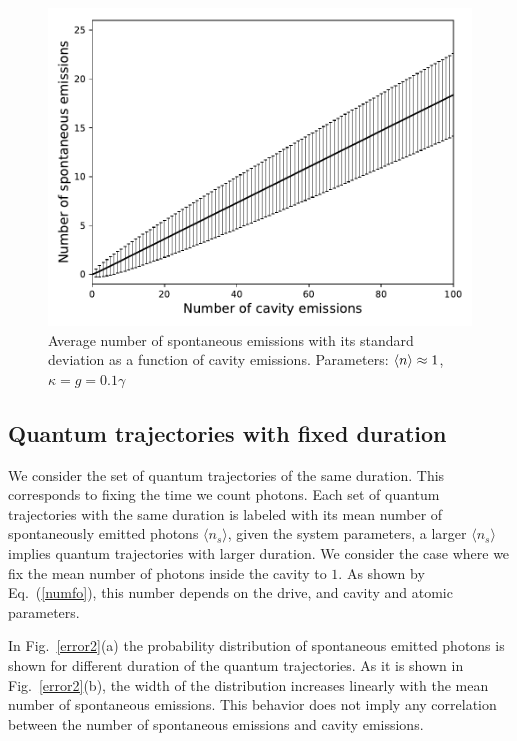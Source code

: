 \documentclass[%
 reprint,
 amsmath,amssymb,
 aps, 
]{revtex4-1}
\begin{document}
\begin{figure}[!h]  
\centering
\includegraphics[scale = 0.5]{newsigma1.pdf}
\caption{Average number of spontaneous emissions with its standard
  deviation as a function of cavity emissions. Parameters: $\expval{n} \approx 1$, $\kappa = g = 0.1\gamma$}
\label{graph}
\end{figure} 




\subsection{Quantum trajectories with fixed duration}
We consider the set of quantum trajectories of the same duration. This
corresponds to fixing the time we count photons. Each set of quantum
trajectories with the same duration is labeled with its mean number
of spontaneously emitted photons $\langle n_s\rangle$, given the system
parameters, a larger $\langle n_s\rangle$ implies quantum trajectories
with larger duration. We consider the case where we fix the mean
number of photons inside the cavity to $1$. As shown by
Eq.~(\ref{numfo}), this number depends on the drive, and cavity and
atomic parameters.

In Fig.~\ref{error2}(a) the probability distribution of spontaneous
emitted photons is shown for different duration of the quantum
trajectories. As it is shown in Fig.~\ref{error2}(b), the width of the
distribution increases linearly with the mean number of spontaneous
emissions. This behavior does not imply any correlation between the
number of spontaneous emissions and cavity emissions.
\end{document}
